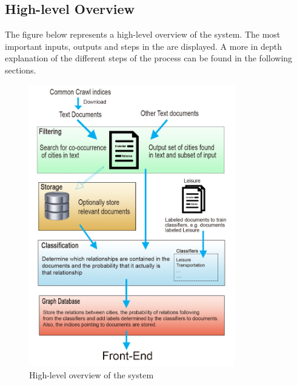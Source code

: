 \subsection{High-level Overview}
The figure below represents a high-level overview of the system. The most important inputs, outputs and steps in the are displayed. A more in depth explanation of the different steps of the process can be found in the following sections.
\begin{figure}[h]
\centering
\includegraphics[width=0.8\textwidth]{System-overview-3}
\caption{High-level overview of the system}
\label{fig:overview}
\end{figure}